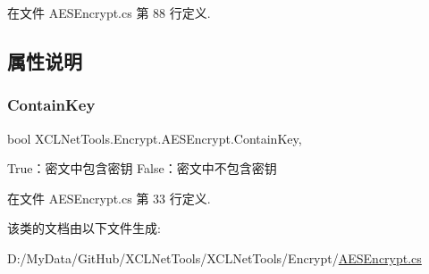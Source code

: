 在文件 A\+E\+S\+Encrypt.\+cs 第 88 行定义.



\subsection{属性说明}
\mbox{\label{class_x_c_l_net_tools_1_1_encrypt_1_1_a_e_s_encrypt_aff7c2c090ff50543aa60c0c5895b8a1e}} 
\subsubsection{\texorpdfstring{Contain\+Key}{ContainKey}}
{\footnotesize\ttfamily bool X\+C\+L\+Net\+Tools.\+Encrypt.\+A\+E\+S\+Encrypt.\+Contain\+Key\hspace{0.3cm}{\ttfamily [get]}, {\ttfamily [set]}}



True：密文中包含密钥 False：密文中不包含密钥 



在文件 A\+E\+S\+Encrypt.\+cs 第 33 行定义.



该类的文档由以下文件生成\+:\begin{DoxyCompactItemize}
\item 
D\+:/\+My\+Data/\+Git\+Hub/\+X\+C\+L\+Net\+Tools/\+X\+C\+L\+Net\+Tools/\+Encrypt/\hyperlink{_a_e_s_encrypt_8cs}{A\+E\+S\+Encrypt.\+cs}\end{DoxyCompactItemize}
